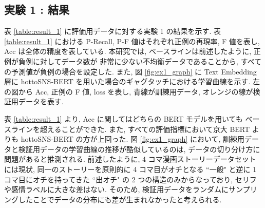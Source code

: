 \begin{table}[!h]
\vspace{10mm}
\caption{損失関数におけるクラス重み}
\label{table:ex_class_weight}
\centering
{}
\end{table}

\newpage
\changeindent{0cm}
\subsection{実験 1 : 結果}
\changeindent{2cm}

表 \ref{table:result_1} に評価用データに対する実験 1 の結果を示す. 表 \ref{table:result_1} における P-Recall, P-F 値はそれぞれ正例の再現率, F 値を表し, Acc は全体の精度を表している.
本研究では, ベースラインは前述したように, 正例が負例に対してデータ数が
非常に少ない不均衡データであることから, すべての予測値が負例の場合を設定した.
また, 図 \ref{fig:ex1_graph} に Text Embedding 層に hottoSNS-BERT を用いた場合のギャグタッチにおける学習曲線を示す. 左の図から Acc, 正例の F 値, loss を表し, 青線が訓練用データ, オレンジの線が検証用データを表す.

表 \ref{table:result_1} より, Acc に関してはどちらの BERT モデルを用いても
ベースラインを超えることができた. また, すべての評価指標において京大 BERT よりも hottoSNS-BERT の方が上回った. 図 \ref{fig:ex1_graph} において, 訓練用データと検証用データの学習曲線の推移が酷似しているのは, データの切り分け方に問題があると推測される. 前述したように, 4 コマ漫画ストーリーデータセットには現状, 同一のストーリーを原則的に 4 コマ目がオチとなる ``一般" と逆に 1 コマ目にオチを持ってきた ``出オチ" の 2 つの構造のみからなっており, セリフや感情ラベルに大きな差はない. そのため, 検証用データをランダムにサンプリングしたことでデータの分布にも差が生まれなかったと考えられる.

